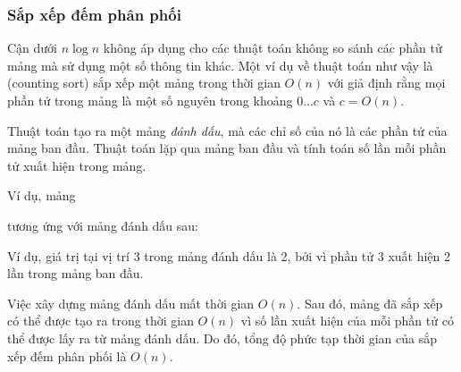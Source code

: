 \subsubsection{Sắp xếp đếm phân phối}


Cận dưới $n \log n$ không áp dụng cho
các thuật toán không so sánh các phần tử mảng
mà sử dụng một số thông tin khác.
Một ví dụ về thuật toán như vậy là
 (counting sort) sắp xếp một mảng trong
thời gian $O(n)$ với giả định rằng mọi phần tử trong mảng
là một số nguyên trong khoảng $0 \ldots c$ và $c=O(n)$.

Thuật toán tạo ra một mảng \emph{đánh dấu},
mà các chỉ số của nó là các phần tử của mảng ban đầu.
Thuật toán lặp qua mảng ban đầu
và tính toán số lần mỗi phần tử
xuất hiện trong mảng.
\newpage

Ví dụ, mảng
\begin{center}
\end{center}
tương ứng với mảng đánh dấu sau:
\begin{center}
\end{center}

Ví dụ, giá trị tại vị trí 3
trong mảng đánh dấu là 2,
bởi vì phần tử 3 xuất hiện 2 lần
trong mảng ban đầu.

Việc xây dựng mảng đánh dấu
mất thời gian $O(n)$. Sau đó, mảng đã sắp xếp
có thể được tạo ra trong thời gian $O(n)$ vì
số lần xuất hiện của mỗi phần tử có thể được lấy ra
từ mảng đánh dấu.
Do đó, tổng độ phức tạp thời gian của sắp xếp đếm phân phối
là $O(n)$.

